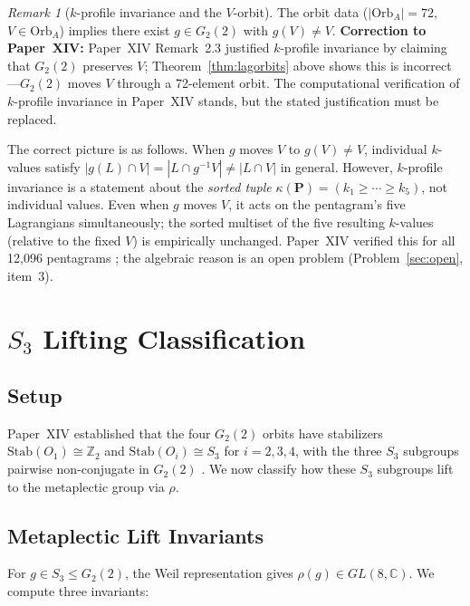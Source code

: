 \documentclass[11pt,a4paper]{article}
\theoremstyle{remark}
\newtheorem{remark}[theorem]{Remark}
\begin{document}
\begin{remark}[$k$-profile invariance and the $V$-orbit]
\label{rem:v-clarify}
The orbit data ($|\mathrm{Orb}_A| = 72$, $V \in \mathrm{Orb}_A$) implies
there exist $g \in G_2(2)$ with $g(V) \neq V$.
\textbf{Correction to Paper~XIV:}
Paper~XIV Remark~2.3 justified $k$-profile invariance by claiming that
$G_2(2)$ preserves $V$; Theorem~\ref{thm:lagorbits} above shows this is
incorrect---$G_2(2)$ moves $V$ through a 72-element orbit.
The computational verification of $k$-profile invariance in Paper~XIV
stands, but the stated justification must be replaced.

The correct picture is as follows.
When $g$ moves $V$ to $g(V) \neq V$, individual $k$-values satisfy
$|g(L) \cap V| = |L \cap g^{-1}V| \neq |L \cap V|$ in general.
However, $k$-profile invariance is a statement about the \emph{sorted tuple}
$\kappa(\mathbf{P}) = (k_1 \geq \cdots \geq k_5)$, not individual values.
Even when $g$ moves $V$, it acts on the pentagram's five Lagrangians
simultaneously; the sorted multiset of the five resulting $k$-values
(relative to the fixed $V$) is empirically unchanged.
Paper~XIV verified this for all 12{,}096 pentagrams
\cite{PaperXIVsuppl}; the algebraic reason is an open problem
(Problem~\ref{sec:open}, item~3).
\end{remark}


\section{\texorpdfstring{$S_3$ Lifting Classification}{S3 Lifting Classification}}\label{sec:s3lift}

\subsection{Setup}

Paper~XIV established that the four $G_2(2)$ orbits have stabilizers
$\mathrm{Stab}(O_1) \cong \mathbb{Z}_2$ and
$\mathrm{Stab}(O_i) \cong S_3$ for $i=2,3,4$,
with the three $S_3$ subgroups pairwise non-conjugate in $G_2(2)$
\cite{PaperXIV}.
We now classify how these $S_3$ subgroups lift to the metaplectic group via
$\rho$.

\subsection{Metaplectic Lift Invariants}

For $g \in S_3 \leq G_2(2)$, the Weil representation gives
$\rho(g) \in GL(8,\mathbb{C})$.
We compute three invariants:
\end{document}
